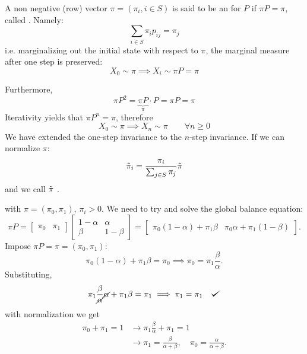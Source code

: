 \documentclass{article}
\begin{document}
\begin{definition}
    A non negative (row) vector $\pi=(\pi_i, i\in S)$ is said to be an  for $P$ if $\pi P=\pi$, called . Namely:
    \[\sum_{i \in S} \pi_i p_{ij}=\pi_j \]
    i.e. marginalizing out the initial state with respect to $\pi$, the marginal measure after one step is preserved:
    \[
    X_0 \sim \pi \implies X_i \sim \pi P = \pi
    \]
\end{definition}
Furthermore,
\[
\pi P^2=\underbrace{\pi P}_{\pi}\cdot P=\pi P= \pi
\]
Iterativity yields that $\pi P^n=\pi$, therefore
\[
X_0\sim \pi \implies X_n\sim\pi \qquad \forall n \geqslant 0
\]
We have extended the one-step invariance to the $n$-step invariance. If we can normalize $\pi$:
\[
\Tilde{\pi}_i=\frac{\pi_i}{\sum_{j\in S}\pi_j}\Tilde{\pi}\]
and we call $\Tilde{\pi}$ .
\begin{example}
        \begin{figure}[H]
            \centering
        \end{figure}
 with $\pi=(\pi_0,\pi_1)$, $\pi_i>0$.
    We need to try and solve the global balance equation:
    \[
    \pi P=\begin{bmatrix}
        \pi_0 & \pi_1
        \end{bmatrix}\begin{bmatrix}
            1-\alpha & \alpha \\
            \beta & 1-\beta
        \end{bmatrix}=\begin{bmatrix}
            \pi_0(1-\alpha)+\pi_1\beta & \pi_0\alpha+\pi_1(1-\beta)
        \end{bmatrix}.
    \]
    Impose $\pi P=\pi=(\pi_0, \pi_1)$:
    \[
    \pi_0(1-\alpha)+\pi_1\beta=\pi_0 \implies \pi_0=\pi_1\frac{\beta}{\alpha}.
    \]
    Substituting,
    \[
    \pi_1\frac{\beta}{\cancel{\alpha}}\cancel{\alpha}+\pi_1\beta=\pi_1 \implies \pi_1=\pi_1 \quad\tikz\fill[scale=0.4](0,.35) -- (.25,0) -- (1,.7) -- (.25,.15) -- cycle;
    \]
    with normalization we get
    \begin{align*}
        \pi_0+\pi_1=1&\longrightarrow{}\pi_1\frac{\beta}{\alpha}+\pi_1=1\\
        &\longrightarrow\pi_1=\frac{\beta}{\alpha+\beta},\quad\pi_0=\frac{\alpha}{\alpha+\beta}.
    \end{align*}
\end{example}
\end{document}
